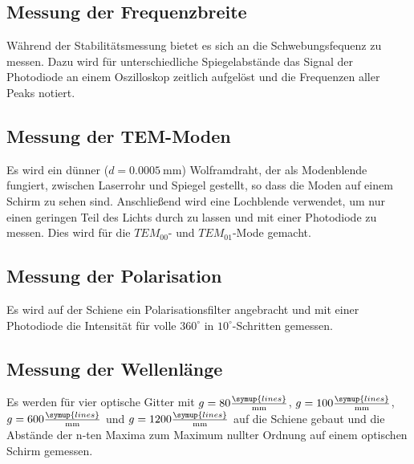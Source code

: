 \subsection{Messung der Frequenzbreite}
Während der Stabilitätsmessung bietet es sich an die Schwebungsfequenz zu messen. Dazu wird für unterschiedliche
Spiegelabstände das Signal der Photodiode an einem Oszilloskop zeitlich aufgelöst und die Frequenzen aller
Peaks notiert.

\subsection{Messung der TEM-Moden}
Es wird ein dünner ($d=\SI{0,0005}{\milli\meter}$) Wolframdraht, der als Modenblende fungiert,
zwischen Laserrohr und Spiegel gestellt, so dass die Moden auf einem Schirm zu sehen sind. Anschließend
wird eine Lochblende verwendet, um nur einen geringen Teil des Lichts durch zu lassen und mit einer Photodiode
zu messen. Dies wird für die $TEM_{00}$- und $TEM_{01}$-Mode gemacht.

\subsection{Messung der Polarisation}
Es wird auf der Schiene ein Polarisationsfilter angebracht und mit einer Photodiode die Intensität für volle
$360^{\circ}$ in $10^{\circ}$-Schritten gemessen.

\subsection{Messung der Wellenlänge}
Es werden für vier optische Gitter mit $g=80 \frac{\symup{lines}}{\si{\milli\meter}}$,
$g=100 \frac{\symup{lines}}{\si{\milli\meter}}$, $g=600 \frac{\symup{lines}}{\si{\milli\meter}}$ und
$g=1200 \frac{\symup{lines}}{\si{\milli\meter}}$ auf die Schiene gebaut und die Abstände der n-ten Maxima
zum Maximum nullter Ordnung auf einem optischen Schirm gemessen.